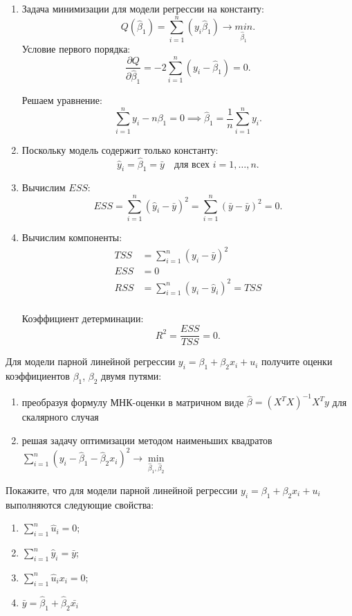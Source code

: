 \documentclass[12pt]{article}
\newcommand{\hb}{\hat{\beta}}
\newcommand{\hu}{\hat{u}}
\newcommand{\hy}{\hat{y}}
\newcommand{\ESS}{ESS}
\begin{document}
\begin{sol}
    
\begin{enumerate}
    \item Задача минимизации для модели регрессии на константу:
    \[
    Q(\hb_1) = \sum_{i=1}^n (y_i \hb_1) \to \underset{\hb_1}{min}.
    \]
Условие первого порядка:
\[
\frac{\partial Q}{\partial \hb_1} = -2\sum_{i=1}^n (y_i - \hb_1) = 0.
\]

Решаем уравнение:
\[
\sum_{i=1}^n y_i - n\beta_1 = 0 \implies \hb_1 = \frac{1}{n}\sum_{i=1}^n y_i.
\]


\item Поскольку модель содержит только константу:
\[
\hat{y}_i = \hat{\beta}_1 = \bar{y} \quad \text{для всех } i=1,\dots,n.
\]

\item Вычислим $\ESS$:
\[
\ESS = \sum_{i=1}^n (\hat{y}_i - \bar{y})^2 = \sum_{i=1}^n (\bar{y} - \bar{y})^2 = 0.
\]

\item Вычислим компоненты:
\begin{align*}
TSS &= \sum_{i=1}^n (y_i - \bar{y})^2 \\
ESS &= 0 \\
RSS &= \sum_{i=1}^n (y_i - \hat{y}_i)^2 = TSS \\
\end{align*}

Коэффициент детерминации:
\[
R^2 = \frac{ESS}{TSS} = 0.
\]
\end{enumerate}
\end{sol}

\begin{problem}
Для модели парной линейной регрессии $y_i = \beta_1 + \beta_2 x_i + u_i$ получите оценки коэффициентов $\beta_1$, $\beta_2$ двумя путями:

\begin{enumerate}
    \item преобразуя формулу МНК-оценки в матричном виде $\hb = (X^TX)^{-1}X^Ty$ для скалярного случая
    \item решая задачу оптимизации методом наименьших квадратов $\sum^n_{i=1} (y_i - \hb_1 - \hb_2 x_i)^2 \to \underset{\hb_1, \hb_2}{\min}$
\end{enumerate}   
\end{problem}

\begin{problem}
    Покажите, что для модели парной линейной регрессии  $y_i = \beta_1 + \beta_2 x_i + u_i$  выполняются следующие свойства:
    \label{task:2lin}
    \begin{enumerate}
        \item $\sum^n_{i=1} \hu_i = 0$;
        \item $\sum^n_{i=1} \hy_i = \bar{y}$;
        \item $\sum^n_{i=1} \hu_i x_i = 0$;
        \item $\bar{y} = \hb_1 + \hb_2 \bar{x_i}$
    \end{enumerate}
\end{problem}
\end{document}
